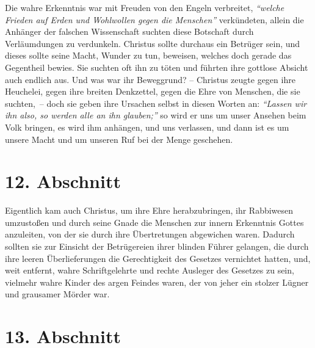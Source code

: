 Die wahre Erkenntnis war mit Freuden von den
Engeln verbreitet, \textit{"`welche Frieden auf Erden
und Wohlwollen gegen die Menschen"'}
verkündeten,
allein die Anhänger der falschen Wissenschaft
suchten diese Botschaft durch Verläumdungen zu verdunkeln. Christus sollte
durchaus ein Betrüger sein, und dieses sollte seine Macht, Wunder
zu tun,
beweisen, welches doch gerade das Gegentheil bewies. Sie suchten oft ihn zu
töten und führten ihre gottlose Absicht auch endlich aus. Und was war ihr
Beweggrund? -- Christus zeugte gegen ihre Heuchelei, gegen ihre
breiten
Denkzettel, gegen die Ehre von Menschen, die sie suchten,~-- doch sie geben ihre
Ursachen selbst in diesen Worten an:
\textit{"`Lassen wir ihn also, so werden alle an ihn
glauben;"'}
so wird er uns um unser Ansehen beim Volk
bringen, es wird ihm anhängen, und uns verlassen, und dann ist es um unsere
Macht und um unseren Ruf bei der Menge geschehen.

\section{12. Abschnitt} \label{kap7_ab12}

Eigentlich kam auch Christus, um ihre Ehre herabzubringen, ihr Rabbiwesen
umzustoßen und durch seine Gnade die Menschen zur innern Erkenntnis Gottes
anzuleiten, von der sie durch ihre Übertretungen abgewichen waren. Dadurch
sollten sie zur Einsicht der Betrügereien ihrer blinden
Führer gelangen, die
durch ihre leeren Überlieferungen die Gerechtigkeit des
Gesetzes vernichtet
hatten, und, weit entfernt, wahre Schriftgelehrte und rechte Ausleger des
Gesetzes zu sein, vielmehr wahre Kinder des argen Feindes waren, der von jeher
ein stolzer Lügner und grausamer Mörder war.

\section{13. Abschnitt} \label{kap7_ab13}

